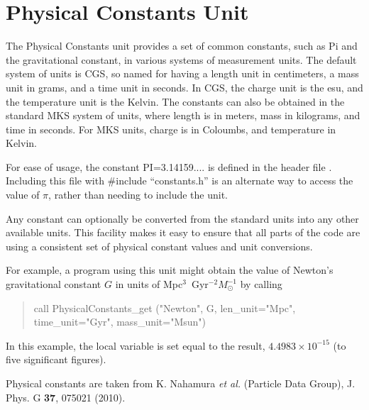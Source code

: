 \chapter{Physical Constants Unit}
\label{Chp:PhysicalConstants} %



The Physical Constants unit provides a set of common constants, such
as Pi and the gravitational constant, in various systems of 
measurement units.
The default system of units is CGS, so named for having a length
unit in centimeters, a mass unit in grams, and a time unit in
seconds. In CGS, the charge unit is the esu, and the temperature
unit is the Kelvin. %
The constants
can also be obtained in the standard MKS system of units, where
length is in meters, mass in kilograms, and time in seconds. For MKS
units, charge is in Coloumbs, and temperature in Kelvin.

\begin{flashtip}
For ease of usage, the constant PI=3.14159.... is defined in 
the header file .  Including this file with
\#include ``constants.h'' is an
alternate way to access the value of $\pi$, rather than needing
to include the  unit.
\end{flashtip}

Any constant can optionally be converted from the standard units
into any other available units. This facility makes it easy to
ensure that all parts of the code are using a consistent set of
physical constant values and unit conversions.

For example, a program using this unit might obtain the
value of Newton's gravitational constant $G$ in units of
Mpc$^3$~Gyr$^{-2}M_\odot^{-1}$ by calling
\begin{quote}
\begin{codeseg}
call PhysicalConstants_get ("Newton", G, len_unit="Mpc",
                       time_unit="Gyr", mass_unit="Msun")
\end{codeseg}
\end{quote}
In this example, the local variable  is set equal to the result,
$4.4983\times 10^{-15}$ (to five significant figures).

Physical constants are taken from K. Nahamura {\it et al.} (Particle
Data Group), J. Phys. G {\bf 37}, 075021 (2010). 


